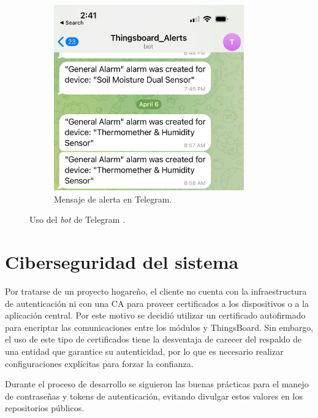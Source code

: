 \begin{figure}[!htpb]
\begin{subfigure}[b]{0.45\textwidth}
	    \includegraphics[width=0.9\textwidth]{./Figures/TB_Alert.jpg}
	     \caption[Mensaje de alerta en Telegram]{Mensaje de alerta en Telegram.}
	     \label{fig:telegram_alerts}
     \end{subfigure}	
	   \hfill
        \caption[Uso del \textit{bot} de Telegram ]{Uso del \textit{bot} de Telegram .}
        \label{fig:Telegram_bot}
\end{figure}









\section{Ciberseguridad del sistema}
\label{sec:Ciberseguridad del sistema}



Por tratarse de un proyecto hogareño, el cliente no cuenta con la infraestructura de autenticación ni con una CA para proveer certificados a los dispositivos o a la aplicación central.
Por este motivo se decidió utilizar un certificado autofirmado para encriptar las comunicaciones entre los módulos y ThingsBoard. Sin embargo, el uso de este tipo de certificados tiene la desventaja de carecer del respaldo de una entidad que garantice su autenticidad, por lo que es necesario realizar configuraciones explícitas para forzar la confianza.


Durante el proceso de desarrollo se siguieron las buenas prácticas para el manejo de contraseñas y tokens de autenticación, evitando divulgar estos valores en los repositorios públicos.




